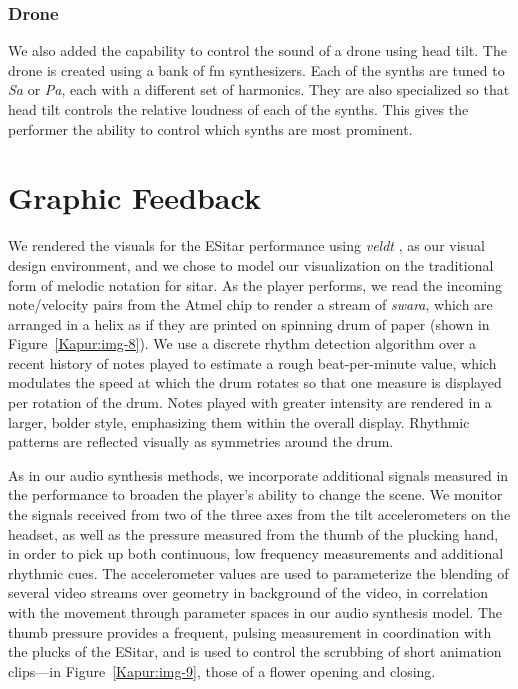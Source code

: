 \subsubsection{Drone}

We also added the capability to control the sound of a drone using head tilt.
The drone is created using a bank of fm synthesizers. Each of the synths are
tuned to \textit{Sa} or \textit{Pa}, each with a different set of harmonics. They
are also specialized so that head tilt controls the relative loudness of each of
the synths. This gives the performer the ability to control which synths are most
prominent.

\section{Graphic Feedback}

We rendered the visuals for the ESitar performance using
\textit{veldt} \cite{Kapur:2003}, as our visual design environment, and we chose to model our
visualization on the traditional form of melodic notation for sitar. As the
player performs, we read the incoming note/velocity pairs from the Atmel chip to
render a stream of \textit{swara}, which are arranged in a helix as if they are
printed on spinning drum of paper (shown in Figure~\ref{Kapur:img-8}).  We use a discrete rhythm
detection algorithm \cite{Dixon:2000} over a recent history of notes played to estimate a rough
beat-per-minute value, which modulates the speed at which the drum rotates so
that one measure is displayed per rotation of the drum.  Notes played with
greater intensity are rendered in a larger, bolder style, emphasizing them within
the overall display. Rhythmic patterns are reflected visually as symmetries
around the drum.

As in our audio synthesis methods, we incorporate additional signals measured in
the performance to broaden the player's ability to change the scene.  We monitor
the signals received from two of the three axes from the tilt accelerometers on
the headset, as well as the pressure measured from the thumb of the plucking
hand, in order to pick up both continuous, low frequency measurements and
additional rhythmic cues.  The accelerometer values are used to parameterize the
blending of several video streams over geometry in background of the video, in
correlation with the movement through parameter spaces in our audio synthesis
model. The thumb pressure provides a frequent, pulsing measurement in
coordination with the plucks of the ESitar, and is used to control the
scrubbing of short animation clips---in Figure~\ref{Kapur:img-9}, those of a flower opening and
closing.

